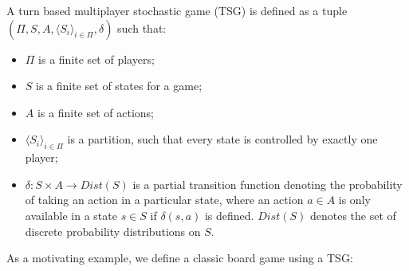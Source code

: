 \begin{definition}
\label{back:tsg}
    A turn based multiplayer stochastic game (TSG) is defined as a tuple $(\Pi, S, A, \langle S_i \rangle_{i \in \Pi}, \delta)$ such that:

    \begin{itemize}
        \item $\Pi$ is a finite set of players;
        \item $S$ is a finite set of states for a game;
        \item $A$ is a finite set of actions;
        \item $\langle S_i \rangle_{i \in \Pi}$ is a partition, such that every state is controlled by exactly one player;
        \item $\delta : S \times A \rightarrow Dist(S)$ is a partial transition function denoting the probability of taking an action in a particular state, where an action $a \in A$ is only available in a state $s \in S$ if $\delta(s, a)$ is defined. $Dist(S)$ denotes the set of discrete probability distributions on $S$.
    \end{itemize}

\end{definition}

As a motivating example, we define a classic board game using a TSG:

